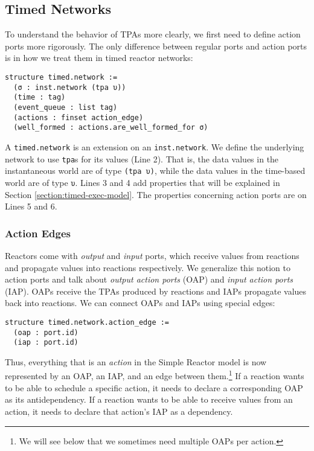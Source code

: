 \subsection{Timed Networks}
\label{section:timed-network}

To understand the behavior of TPAs more clearly, we first need to define action ports more rigorously.
The only difference between regular ports and action ports is in how we treat them in timed reactor networks:

\lstset{numbers=left, xleftmargin=1.5em}
\begin{lstlisting}
structure timed.network :=
  (σ : inst.network (tpa υ))
  (time : tag)
  (event_queue : list tag)
  (actions : finset action_edge)
  (well_formed : actions.are_well_formed_for σ)
\end{lstlisting}
\lstset{numbers=none, xleftmargin=0em}

\noindent A \lstinline{timed.network} is an extension on an \lstinline{inst.network}.
We define the underlying network to use \lstinline{tpa}s for its values (Line 2).
That is, the data values in the instantaneous world are of type \lstinline{(tpa υ)}, while the data values in the time-based world are of type \lstinline{υ}.
Lines 3 and 4 add properties that will be explained in Section \ref{section:timed-exec-model}.
The properties concerning action ports are on Lines 5 and 6.

\subsubsection{Action Edges}

Reactors come with \emph{output} and \emph{input} ports, which receive values from reactions and propagate values into reactions respectively.
We generalize this notion to action ports and talk about \emph{output action ports} (OAP) and \emph{input action ports} (IAP).
OAPs receive the TPAs produced by reactions and IAPs propagate values back into reactions.
We can connect OAPs and IAPs using special edges:

\begin{lstlisting}
structure timed.network.action_edge := 
  (oap : port.id)
  (iap : port.id)
\end{lstlisting}

\noindent Thus, everything that is an \emph{action} in the Simple Reactor model is now represented by an OAP, an IAP, and an edge between them.\footnote{
    We will see below that we sometimes need multiple OAPs per action.
}
If a reaction wants to be able to schedule a specific action, it needs to declare a corresponding OAP as its antidependency.
If a reaction wants to be able to receive values from an action, it needs to declare that action's IAP as a dependency.


